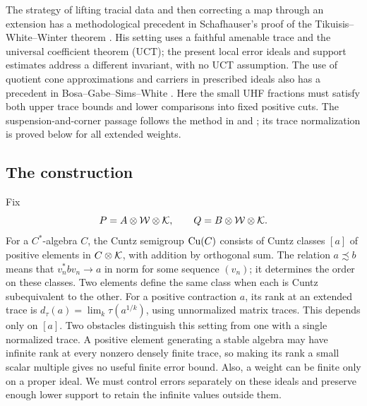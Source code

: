 The strategy of lifting tracial data and then correcting a map through
an extension has a methodological precedent in Schafhauser's proof of
the Tikuisis--White--Winter theorem \cite{Schafhauser}. His setting
uses a faithful amenable trace and the universal coefficient theorem
(UCT); the present local error
ideals and support estimates address a different invariant, with no
UCT assumption. The use of quotient cone approximations and carriers
in prescribed ideals also has a precedent in
Bosa--Gabe--Sims--White \cite[Section~3]{BGSW}. Here the small UHF
fractions must satisfy both upper trace bounds and lower comparisons
into fixed positive cuts. The suspension-and-corner passage follows
the method in \cite[Remark~6.4]{GabeO2} and
\cite[proof of Theorem~14.1]{Gabe}; its trace normalization is proved
below for all extended weights.

\subsection{The construction}

Fix
\[
 P=A\otimes\mathcal W\otimes\mathcal K,\qquad
 Q=B\otimes\mathcal W\otimes\mathcal K.
\]
For a $C^*$-algebra $C$, the Cuntz semigroup $\operatorname{Cu}(C)$ consists of
Cuntz classes $[a]$ of positive elements in $C\otimes\mathcal K$, with addition
by orthogonal sum. The relation $a\precsim b$ means that
$v_n^*bv_n\to a$ in norm for some sequence $(v_n)$; it determines the
order on these classes. Two elements define the same class when each
is Cuntz subequivalent to the other. For a positive contraction $a$, its rank at an
extended trace is $d_\tau(a)=\lim_k\tau(a^{1/k})$, using unnormalized
matrix traces. This depends only on $[a]$.
Two obstacles distinguish this setting from one with a single
normalized trace. A positive element generating a stable algebra may
have infinite rank at every nonzero densely finite trace, so making
its rank a small scalar multiple gives no useful finite error bound.
Also, a weight can be finite only on a proper ideal. We must control
errors separately on these ideals and preserve enough lower support
to retain the infinite values outside them.

